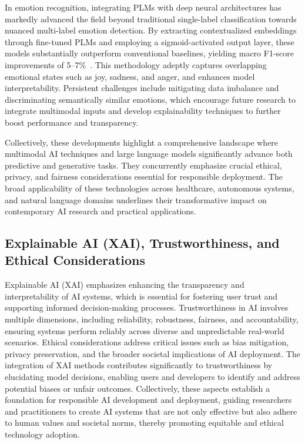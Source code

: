 \documentclass[sigconf]{acmart}
\begin{document}
In emotion recognition, integrating PLMs with deep neural architectures has markedly advanced the field beyond traditional single-label classification towards nuanced multi-label emotion detection. By extracting contextualized embeddings through fine-tuned PLMs and employing a sigmoid-activated output layer, these models substantially outperform conventional baselines, yielding macro F1-score improvements of 5–7\%~\cite{ref36}. This methodology adeptly captures overlapping emotional states such as joy, sadness, and anger, and enhances model interpretability. Persistent challenges include mitigating data imbalance and discriminating semantically similar emotions, which encourage future research to integrate multimodal inputs and develop explainability techniques to further boost performance and transparency.

Collectively, these developments highlight a comprehensive landscape where multimodal AI techniques and large language models significantly advance both predictive and generative tasks. They concurrently emphasize crucial ethical, privacy, and fairness considerations essential for responsible deployment. The broad applicability of these technologies across healthcare, autonomous systems, and natural language domains underlines their transformative impact on contemporary AI research and practical applications.

\subsection{Explainable AI (XAI), Trustworthiness, and Ethical Considerations}
Explainable AI (XAI) emphasizes enhancing the transparency and interpretability of AI systems, which is essential for fostering user trust and supporting informed decision-making processes. Trustworthiness in AI involves multiple dimensions, including reliability, robustness, fairness, and accountability, ensuring systems perform reliably across diverse and unpredictable real-world scenarios. Ethical considerations address critical issues such as bias mitigation, privacy preservation, and the broader societal implications of AI deployment. The integration of XAI methods contributes significantly to trustworthiness by elucidating model decisions, enabling users and developers to identify and address potential biases or unfair outcomes. Collectively, these aspects establish a foundation for responsible AI development and deployment, guiding researchers and practitioners to create AI systems that are not only effective but also adhere to human values and societal norms, thereby promoting equitable and ethical technology adoption.
\end{document}

